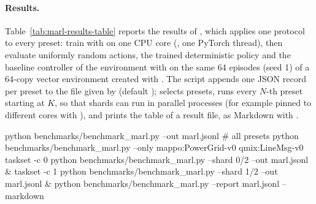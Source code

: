 \paragraph{Results.} Table~\ref{tab:marl-results-table} reports the results
of , which applies one protocol to every
preset: train with  on one CPU
core (, one PyTorch thread), then evaluate uniformly
random actions, the trained deterministic policy and the baseline controller
of the environment with  on the same 64 episodes (seed
1) of a 64-copy vector environment created with . The
script appends one JSON record per preset to the file given by 
(default ); 
selects presets,  runs every $N$-th preset starting at
$K$, so that shards can run in parallel processes (for example pinned to
different cores with ), and  prints the
table of a result file, as Markdown with .

\begin{shellcode}
python benchmarks/benchmark_marl.py --out marl.jsonl          # all presets
python benchmarks/benchmark_marl.py --only mappo:PowerGrid-v0 qmix:LineMsg-v0
taskset -c 0 python benchmarks/benchmark_marl.py --shard 0/2 --out marl.jsonl &
taskset -c 1 python benchmarks/benchmark_marl.py --shard 1/2 --out marl.jsonl &
python benchmarks/benchmark_marl.py --report marl.jsonl --markdown
\end{shellcode}

